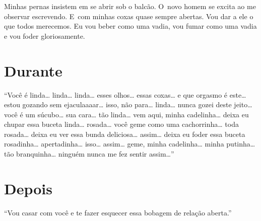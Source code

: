 Minhas pernas insistem em se abrir sob o balcão. O~novo homem se excita
ao me observar escrevendo. E~com minhas coxas quase sempre abertas. Vou
dar a ele o que todos merecemos. Eu vou beber como uma vadia, vou fumar
como uma vadia e vou foder gloriosamente.

\chapter{Durante}

``Você é linda… linda… linda… esses olhos…
essas coxas… e que orgasmo é este… estou gozando sem
ejaculaaaar… isso, não para… linda… nunca gozei
deste jeito… você é um súcubo… sua cara… tão
linda… vem aqui, minha cadelinha… deixa eu chupar essa
buceta linda… rosada… você geme como uma
cachorrinha… toda rosada… deixa eu ver essa bunda
deliciosa… assim… deixa eu foder essa buceta
rosadinha… apertadinha… isso… assim… geme,
minha cadelinha… minha putinha… tão branquinha…
ninguém nunca me fez sentir assim…''

\chapter{Depois}

``Vou casar com você e te fazer esquecer essa bobagem de relação
aberta.''

\paginabranca{} 

\paginabranca{} 
